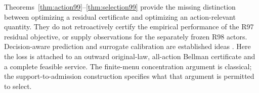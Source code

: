 Theorems~\ref{thm:action99}--\ref{thm:selection99} provide the missing distinction between optimizing a residual certificate and optimizing an action-relevant quantity. They do not retroactively certify the empirical performance of the R97 residual objective, or supply observations for the separately frozen R98 actors. Decision-aware prediction and surrogate calibration are established ideas \citep{ElmachtoubGrigas2022,LiuGrigas2021}. Here the loss is attached to an outward original-law, all-action Bellman certificate and a complete feasible service. The finite-menu concentration argument is classical; the support-to-admission construction specifies what that argument is permitted to select.
